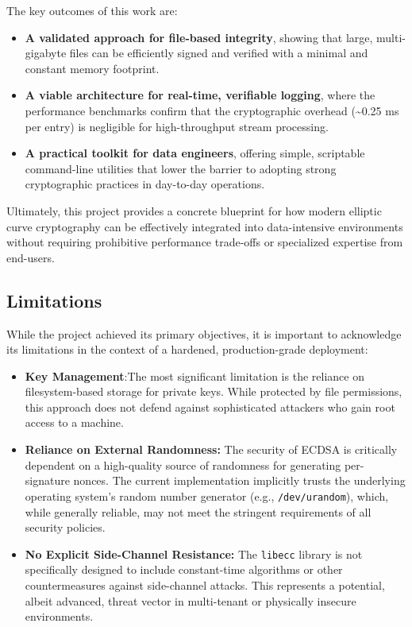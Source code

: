 \documentclass[12pt, letterpaper]{article}
\begin{document}
	The key outcomes of this work are:
	\begin{itemize}
		\item \textbf{A validated approach for file-based integrity}, showing that large, multi-gigabyte files can be efficiently signed and verified with a minimal and constant memory footprint.
		\item \textbf{A viable architecture for real-time, verifiable logging}, where the performance benchmarks confirm that the cryptographic overhead (\textasciitilde 0.25 ms per entry) is negligible for high-throughput stream processing.
		\item \textbf{A practical toolkit for data engineers}, offering simple, scriptable command-line utilities that lower the barrier to adopting strong cryptographic practices in day-to-day operations.
	\end{itemize}
	Ultimately, this project provides a concrete blueprint for how modern elliptic curve cryptography can be effectively integrated into data-intensive environments without requiring prohibitive performance trade-offs or specialized expertise from end-users.
	
	\subsection{Limitations}
	While the project achieved its primary objectives, it is important to acknowledge its limitations in the context of a hardened, production-grade deployment:
	\begin{itemize}
		\item \textbf{Key Management}:The most significant limitation is the reliance on filesystem-based storage for private keys. While protected by file permissions, this approach does not defend against sophisticated attackers who gain root access to a machine.
		\item \textbf{Reliance on External Randomness:} The security of ECDSA is critically dependent on a high-quality source of randomness for generating per-signature nonces. The current implementation implicitly trusts the underlying operating system's random number generator (e.g., \texttt{/dev/urandom}), which, while generally reliable, may not meet the stringent requirements of all security policies.
		\item \textbf{No Explicit Side-Channel Resistance:} The \texttt{libecc} library is not specifically designed to include constant-time algorithms or other countermeasures against side-channel attacks. This represents a potential, albeit advanced, threat vector in multi-tenant or physically insecure environments.
	\end{itemize}
		
\end{document}
